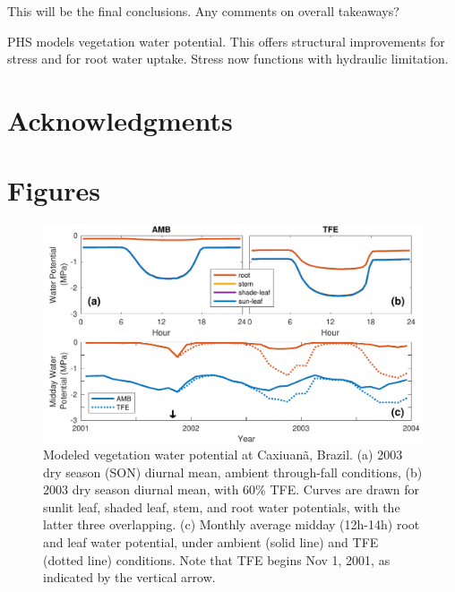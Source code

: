 \documentclass[draft,linenumbers]{agujournal}
\begin{document}
   
    This will be the final conclusions.
    Any comments on overall takeaways?

    PHS models vegetation water potential. 
    This offers structural improvements for stress and for root water uptake.
    Stress now functions with hydraulic limitation.
    
    

\section{Acknowledgments}

\clearpage    

\section{Figures}
  \begin{figure}[h]
     \centering
     \includegraphics[width=30pc]{../figs3/vwp.pdf}
     \caption{Modeled vegetation water potential at  Caxiuan\~a, Brazil.
     (a) 2003 dry season (SON) diurnal mean, ambient through-fall conditions,
     (b) 2003 dry season diurnal mean, with 60\% TFE.
     Curves are drawn for sunlit leaf, shaded leaf, stem, and root water potentials, with the latter three overlapping.
     (c) Monthly average midday (12h-14h) root and leaf water potential, under ambient (solid line) and TFE (dotted line) conditions.
     Note that TFE begins Nov 1, 2001, as indicated by the vertical arrow. 
     }
     \label{fig:vwp}
  \end{figure}
\end{document}
